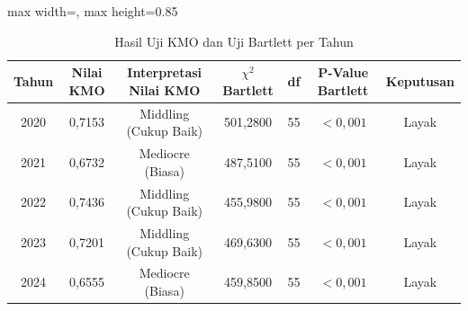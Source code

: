 \begin{table}[H]
\centering
\caption{Hasil Uji KMO dan Uji Bartlett per Tahun} \label{tab:app1kmo_bartlett}
\begin{adjustbox}{max width=\textwidth, max height=0.85\textheight}
\begin{tabular}{|c|c|c|c|c|c|c|}
\hline
\textbf{Tahun} & \textbf{Nilai KMO} & \textbf{Interpretasi Nilai KMO} & \textbf{$\chi^2$ Bartlett} & \textbf{df} & \textbf{P-Value Bartlett} & \textbf{Keputusan} \\
\hline
2020 & 0,7153 & Middling (Cukup Baik) & 501,2800 & 55 & $< 0,001$ & Layak \\
2021 & 0,6732 & Mediocre (Biasa) & 487,5100 & 55 & $< 0,001$ & Layak \\
2022 & 0,7436 & Middling (Cukup Baik) & 455,9800 & 55 & $< 0,001$ & Layak \\
2023 & 0,7201 & Middling (Cukup Baik) & 469,6300 & 55 & $< 0,001$ & Layak \\
2024 & 0,6555 & Mediocre (Biasa) & 459,8500 & 55 & $< 0,001$ & Layak \\
\hline
\end{tabular}
\end{adjustbox}
\end{table}